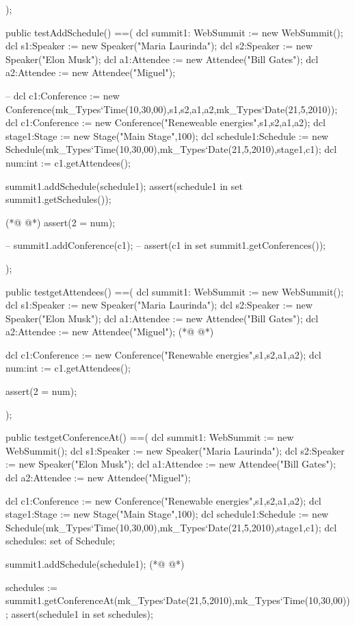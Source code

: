 \begin{vdmpp}[breaklines=true]
 );
 
 public testAddSchedule() ==(
  dcl summit1: WebSummit := new WebSummit();
  dcl s1:Speaker := new Speaker("Maria Laurinda");
  dcl s2:Speaker := new Speaker("Elon Musk");
  dcl a1:Attendee := new Attendee("Bill Gates");
  dcl a2:Attendee := new Attendee("Miguel");
  
   
 -- dcl c1:Conference := new Conference(mk_Types`Time(10,30,00),{s1,s2},{a1,a2},mk_Types`Date(21,5,2010));
  dcl c1:Conference := new Conference("Reneweable energies",{s1,s2},{a1,a2});
  dcl stage1:Stage := new Stage("Main Stage",100);
  dcl schedule1:Schedule := new Schedule(mk_Types`Time(10,30,00),mk_Types`Date(21,5,2010),stage1,c1);
  dcl num:int := c1.getAttendees();
  
  summit1.addSchedule(schedule1);
  assert(schedule1 in set summit1.getSchedules());
 
(*@
\label{testgetAttendees:96}
@*)
  assert(2 = num);
  
 -- summit1.addConference(c1);
 -- assert(c1 in set summit1.getConferences()); 
  
 
 );
 
  public testgetAttendees() ==(
  dcl summit1: WebSummit := new WebSummit();
  dcl s1:Speaker := new Speaker("Maria Laurinda");
  dcl s2:Speaker := new Speaker("Elon Musk");
  dcl a1:Attendee := new Attendee("Bill Gates");
  dcl a2:Attendee := new Attendee("Miguel");
(*@
\label{testgetConferenceAt:110}
@*)
  
  dcl c1:Conference := new Conference("Renewable energies",{s1,s2},{a1,a2});
  dcl num:int := c1.getAttendees();
 
  assert(2 = num);

 );
 
 public testgetConferenceAt() ==( 
  dcl summit1: WebSummit := new WebSummit();
  dcl s1:Speaker := new Speaker("Maria Laurinda");
  dcl s2:Speaker := new Speaker("Elon Musk");
  dcl a1:Attendee := new Attendee("Bill Gates");
  dcl a2:Attendee := new Attendee("Miguel");
  
  dcl c1:Conference := new Conference("Renewable energies",{s1,s2},{a1,a2});
  dcl stage1:Stage := new Stage("Main Stage",100);
  dcl schedule1:Schedule := new Schedule(mk_Types`Time(10,30,00),mk_Types`Date(21,5,2010),stage1,c1);
  dcl schedules: set of Schedule;
  
  summit1.addSchedule(schedule1);
(*@
\label{testgetTitle:131}
@*)
  
  
  schedules := summit1.getConferenceAt(mk_Types`Date(21,5,2010),mk_Types`Time(10,30,00));
  assert(schedule1 in set schedules);
 

\end{vdmpp}
